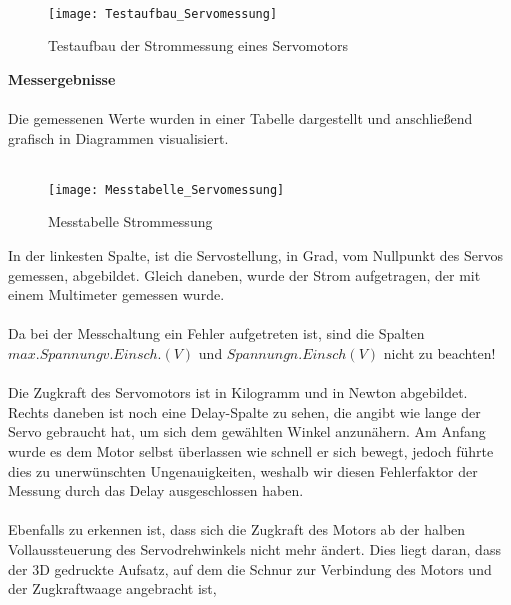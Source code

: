 \documentclass[titlepage,12pt,twoside]{article}
\begin{document}
\\
\begin{figure}[H]
	\begin{center}
		\scalebox{0.8}
		{\texttt{[image: Testaufbau\_Servomessung]}}
		\caption{Testaufbau der Strommessung eines Servomotors}
		\label{fig:Testaufbau_Servomessung}		
	\end{center}
\end{figure}
\hfill \break
\hfill \break
\hfill \break
\hfill \break
\hfill \break
\hfill \break
\hfill \break
\hfill \break
\hfill \break
\hfill \break
\hfill \break
\hfill \break
\hfill \break
\textbf{Messergebnisse} \\
\\
Die gemessenen Werte wurden in einer Tabelle dargestellt und anschließend grafisch in Diagrammen visualisiert. \\
\\
\begin{figure}[H]
	\begin{center}
		\scalebox{1.3}
		{\texttt{[image: Messtabelle\_Servomessung]}}
		\caption{Messtabelle Strommessung}
		\label{fig:Messtabelle_Servomessung}		
	\end{center}
\end{figure}
\hfill \break
In der linkesten Spalte, ist die Servostellung, in Grad, vom Nullpunkt des Servos gemessen, abgebildet. Gleich daneben, wurde 
der Strom aufgetragen, der mit einem Multimeter gemessen wurde. \\
\\
Da bei der Messchaltung ein Fehler aufgetreten ist, sind die Spalten $max. Spannung v. Einsch. (V)$ und $Spannung n. Einsch(V)$
nicht zu beachten! \\
\\
Die Zugkraft des Servomotors ist in Kilogramm und in Newton abgebildet. Rechts daneben ist noch eine Delay-Spalte zu sehen, die
angibt wie lange der Servo gebraucht hat, um sich dem gewählten Winkel anzunähern. Am Anfang wurde es dem Motor selbst überlassen
wie schnell er sich bewegt, jedoch führte dies zu unerwünschten Ungenauigkeiten, weshalb wir diesen Fehlerfaktor der Messung durch 
das Delay ausgeschlossen haben. \\
\\
Ebenfalls zu erkennen ist, dass sich die Zugkraft des Motors ab der halben Vollaussteuerung des Servodrehwinkels nicht mehr ändert.
Dies liegt daran, dass der 3D gedruckte Aufsatz, auf dem die Schnur zur Verbindung des Motors und der Zugkraftwaage angebracht ist,
\end{document}
